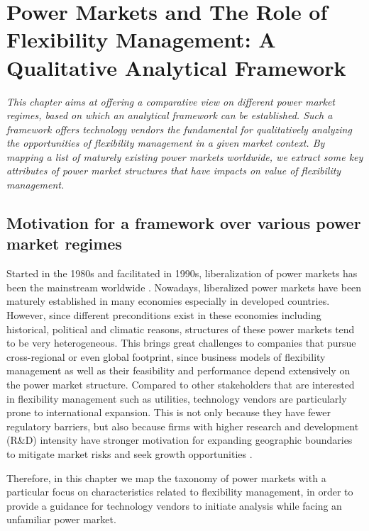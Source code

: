 \chapter{Power Markets and The Role of Flexibility Management: A Qualitative Analytical Framework}
\label{ch:market}
\textit{This chapter aims at offering a comparative view on different power market regimes, based on which an analytical framework can be established. Such a framework offers technology vendors the fundamental for qualitatively analyzing the opportunities of flexibility management in a given market context. By mapping a list of maturely existing power markets worldwide, we extract some key attributes of power market structures that have impacts on value of flexibility management.}

\section{Motivation for a framework over various power market regimes}

Started in the 1980s and facilitated in 1990s, liberalization of power markets has been the mainstream worldwide \cite{Srivastava2011,Ranci2013,Vagliasindi2013}. Nowadays, liberalized power markets have been maturely established in many economies especially in developed countries. 
However, since different preconditions exist in these economies including historical, political and climatic reasons, structures of these power markets tend to be very heterogeneous. %
This brings great challenges to companies that pursue cross-regional or even global footprint, since business models of flexibility management as well as their feasibility and performance depend extensively on the power market structure. Compared to other stakeholders that are interested in flexibility management such as utilities, technology vendors are particularly prone to international expansion. This is not only because they have fewer regulatory barriers, but also because firms with higher research and development (R\&D) intensity have stronger motivation for expanding geographic boundaries to mitigate market risks and seek growth opportunities \cite{Brouthers2007}.

Therefore, in this chapter we map the taxonomy of power markets with a particular focus on characteristics related to flexibility management, in order to provide a guidance for technology vendors to initiate analysis while facing an unfamiliar power market.

